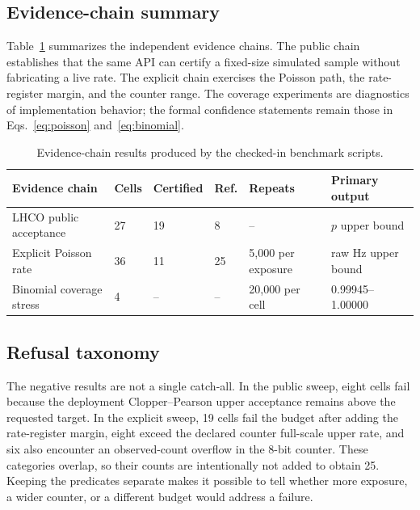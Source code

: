 \documentclass[preprint,12pt]{elsarticle}
\begin{document}
\subsection{Evidence-chain summary}

Table~\ref{tab:results} summarizes the independent evidence chains.  The
public chain establishes that the same API can certify a fixed-size simulated
sample without fabricating a live rate.  The explicit chain exercises the
Poisson path, the rate-register margin, and the counter range.  The coverage
experiments are diagnostics of implementation behavior; the formal confidence
statements remain those in Eqs.~\eqref{eq:poisson} and~\eqref{eq:binomial}.

\begin{table}[t]
\centering\small
\caption{Evidence-chain results produced by the checked-in benchmark scripts.}
\label{tab:results}
\begin{tabular}{p{}p{}p{}p{}p{}p{}}
\toprule
Evidence chain & Cells & Certified & Ref. & Repeats & Primary output \\
\midrule
LHCO public acceptance & 27 & 19 & 8 & -- & $p$ upper bound \\
Explicit Poisson rate & 36 & 11 & 25 & 5,000 per exposure & raw Hz upper bound \\
Binomial coverage stress & 4 & -- & -- & 20,000 per cell & 0.99945--1.00000 \\
\bottomrule
\end{tabular}
\end{table}

\subsection{Refusal taxonomy}

The negative results are not a single catch-all.  In the public sweep, eight
cells fail because the deployment Clopper--Pearson upper acceptance remains
above the requested target.  In the explicit sweep, 19 cells fail the budget
after adding the rate-register margin, eight exceed the declared counter
full-scale upper rate, and six also encounter an observed-count overflow in the
8-bit counter.  These categories overlap, so their counts are intentionally not
added to obtain 25.  Keeping the predicates separate makes it possible to tell
whether more exposure, a wider counter, or a different budget would address a
failure.
\end{document}
